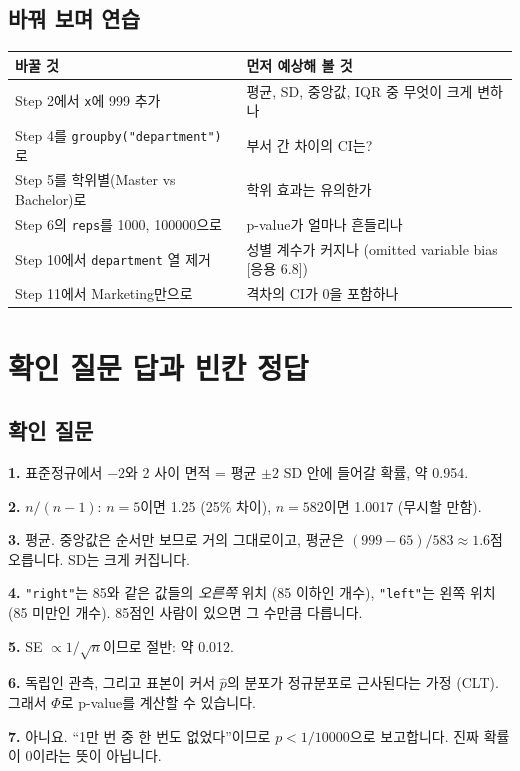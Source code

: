 \documentclass[11pt,a4paper]{article}
\newcommand{\code}[1]{\texttt{#1}}
\newcommand{\Hc}[1]{{\scriptsize\textsf{\color{orange!70!black}[응용 #1]}}}
\begin{document}
\subsection{바꿔 보며 연습}
\begin{center}\small
\begin{tabular}{@{}l l@{}}
\toprule
바꿀 것 & 먼저 예상해 볼 것 \\
\midrule
Step 2에서 \code{x}에 999 추가 & 평균, SD, 중앙값, IQR 중 무엇이 크게 변하나 \\
Step 4를 \code{groupby("department")}로 & 부서 간 차이의 CI는? \\
Step 5를 학위별(Master vs Bachelor)로 & 학위 효과는 유의한가 \\
Step 6의 \code{reps}를 1000, 100000으로 & p-value가 얼마나 흔들리나 \\
Step 10에서 \code{department} 열 제거 & 성별 계수가 커지나 (omitted variable bias \Hc{6.8}) \\
Step 11에서 Marketing만으로 & 격차의 CI가 0을 포함하나 \\
\bottomrule
\end{tabular}
\end{center}

\section{확인 질문 답과 빈칸 정답}
\subsection{확인 질문}
\textbf{1.} 표준정규에서 $-2$와 2 사이 면적 = 평균 $\pm2$ SD 안에 들어갈 확률, 약 0.954.

\textbf{2.} $n/(n-1)$: $n=5$이면 1.25 (25\% 차이), $n=582$이면 1.0017 (무시할 만함).

\textbf{3.} 평균. 중앙값은 순서만 보므로 거의 그대로이고, 평균은 $(999-65)/583\approx1.6$점 오릅니다. SD는 크게 커집니다.

\textbf{4.} \code{"right"}는 85와 같은 값들의 \emph{오른쪽} 위치 (85 이하인 개수), \code{"left"}는 왼쪽 위치 (85 미만인 개수). 85점인 사람이 있으면 그 수만큼 다릅니다.

\textbf{5.} SE $\propto1/\sqrt n$이므로 절반: 약 0.012.

\textbf{6.} 독립인 관측, 그리고 표본이 커서 $\hat p$의 분포가 정규분포로 근사된다는 가정 (CLT). 그래서 $\Phi$로 p-value를 계산할 수 있습니다.

\textbf{7.} 아니요. ``1만 번 중 한 번도 없었다''이므로 $p<1/10000$으로 보고합니다. 진짜 확률이 0이라는 뜻이 아닙니다.
\end{document}
